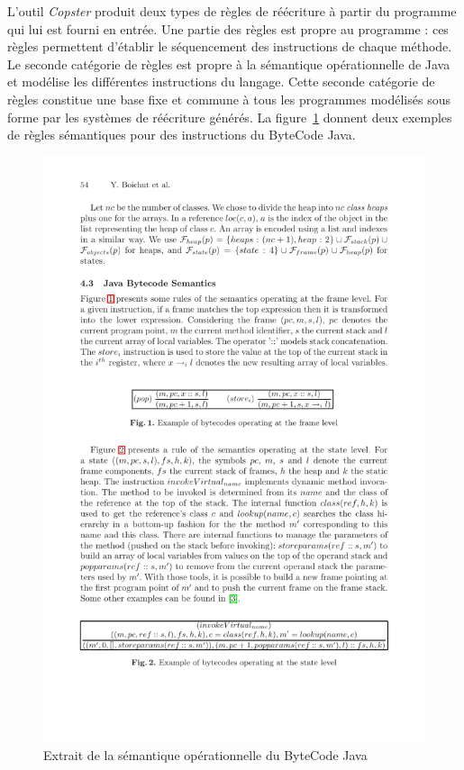 L'outil \emph{Copster} produit deux types de règles de réécriture à
partir du programme qui lui est fourni en entrée. Une partie des règles est propre
au programme : ces règles permettent d'établir le séquencement des
instructions de chaque méthode. Le seconde catégorie de règles est
propre à la sémantique opérationnelle de Java et modélise les
différentes instructions du langage.
Cette seconde catégorie de règles constitue une base fixe et commune à tous
les programmes modélisés sous forme par les systèmes de réécriture générés.
La figure~\ref{fig:semantique-java} donnent deux exemples de règles
sémantiques pour des instructions du ByteCode Java.

\begin{figure}[ht!]
  \centering
  \includegraphics[scale=1.3]{jvm_1}
  \caption{\footnotesize Extrait de la sémantique opérationnelle du ByteCode Java}
  \label{fig:semantique-java}
\end{figure}


